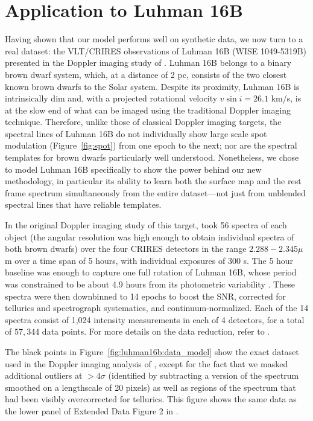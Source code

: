 \documentclass[modern]{aastex631}
\begin{document}
\section{Application to Luhman 16B}
\label{sec:luhman16b}
%

Having shown that our model performs well on synthetic data, we now turn to a real dataset: the VLT/CRIRES observations of Luhman 16B (WISE 1049-5319B) presented in the Doppler imaging study of \citet{Crossfield2014}.
Luhman 16B belongs to a binary brown dwarf system, which, at a distance of 2 pc, consists of the two closest known brown dwarfs to the Solar system.
Despite its proximity, Luhman 16B is intrinsically dim and, with a projected rotational velocity $v \sin i = 26.1$ km/s, is at the slow end of what can be imaged using the traditional Doppler imaging technique.
Therefore, unlike those of classical Doppler imaging targets, the spectral lines of Luhman 16B do not individually show large scale spot modulation (Figure~\ref{fig:spot}) from one epoch to the next; nor are the spectral templates for brown dwarfs particularly well understood.
Nonetheless, we chose to model Luhman 16B specifically to show the power behind our new methodology, in particular its ability to learn both the surface map and the rest frame spectrum simultaneously from the entire dataset---not just from unblended spectral lines that have reliable templates.

In the original Doppler imaging study of this target, \citet{Crossfield2014} took 56 spectra of each object (the angular resolution was high enough to obtain individual spectra of both brown dwarfs) over the four CRIRES detectors in the range $2.288-2.345 \mu$m over a time span of 5 hours, with individual exposures of 300 s.
The 5 hour baseline was enough to capture one full rotation of Luhman 16B, whose period was constrained to be about 4.9 hours from its photometric variability \citep{Gillon2013}.
These spectra were then downbinned to 14 epochs to boost the SNR, corrected for tellurics and spectrograph systematics, and continuum-normalized.
Each of the 14 spectra consist of 1,024 intensity measurements in each of 4 detectors, for a total of $57,344$ data points.
For more details on the data reduction, refer to \citet{Crossfield2014}.

The black points in Figure~\ref{fig:luhman16b:data_model} show the exact dataset used in the Doppler imaging analysis of \citet{Crossfield2014}, except for the fact that we masked additional outliers at $>4\sigma$ (identified by subtracting a version of the spectrum smoothed on a lengthscale of 20 pixels) as well as regions of the spectrum that had been visibly overcorrected for tellurics.
This figure shows the same data as the lower panel of Extended Data Figure 2 in \citet{Crossfield2014}.
\end{document}
